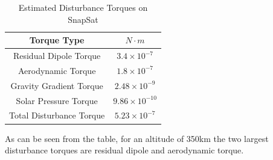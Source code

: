\begin{table}[H]
    \begin{center}
        \caption{Estimated Disturbance Torques on SnapSat}
        \begin{tabular}{|c|c|}
            \hline
            Torque Type & $N \cdot m$ \\
            \hline
            Residual Dipole Torque & $3.4 \times 10^{-7}$ \\
            \hline
            Aerodynamic Torque & $1.8 \times 10^{-7}$ \\
            \hline
            Gravity Gradient Torque & $2.48 \times 10^{-9}$ \\
            \hline
            Solar Pressure Torque & $9.86 \times 10^{-10}$ \\
            \hline
            Total Disturbance Torque & $5.23 \times 10^{-7}$ \\
            \hline
        \end{tabular}
    \end{center}
    \vspace{-6mm}
\end{table}
As can be seen from the table, for an altitude of 350km the two largest disturbance torques are residual dipole and aerodynamic torque.